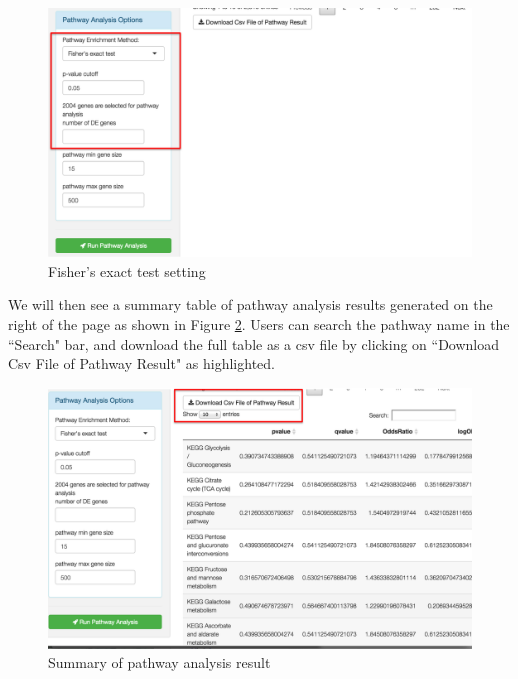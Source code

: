 \begin{figure}[H]
\begin{center}
\includegraphics[scale=0.45]{./figure/metaDE/FisherExact}
\caption{Fisher's exact test setting}
\label{fig:FisherExact}
\end{center}
\end{figure}

We will then see a summary table of pathway analysis results generated on the right of the page as shown in Figure \ref{fig:PathResult}. Users can search the pathway name in the ``Search" bar, and download the full table as a csv file by clicking on ``Download Csv File of Pathway Result" as highlighted. 

\begin{figure}[H]
\begin{center}
\includegraphics[scale=0.45]{./figure/metaDE/PathResult}
\caption{Summary of pathway analysis result}
\label{fig:PathResult}
\end{center}
\end{figure}

